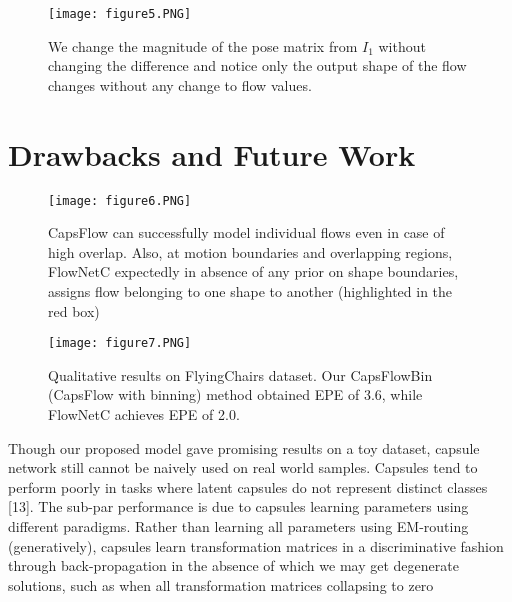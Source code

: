 \documentclass[11pt]{article}
\begin{document}
\begin{figure}
\centering
\texttt{[image: figure5.PNG]}
\caption{We change the magnitude of the pose matrix from
\(I_{1}\) without changing the difference and notice only the output shape of the flow changes without any change to flow
values.
}
\end{figure}


\section{Drawbacks and Future Work}

\begin{figure*}
\centering
\texttt{[image: figure6.PNG]}
\caption{CapsFlow can successfully model individual flows even in case of high overlap. Also, at motion boundaries and
overlapping regions, FlowNetC expectedly in absence of any prior on shape boundaries, assigns flow belonging to one shape
to another (highlighted in the red box)}
\end{figure*}

\begin{figure*}
\centering
\texttt{[image: figure7.PNG]}
\caption{Qualitative results on FlyingChairs dataset. Our CapsFlowBin (CapsFlow with binning) method obtained EPE of
3.6, while FlowNetC achieves EPE of 2.0.}
\end{figure*}

Though our proposed model gave promising results on
a toy dataset, capsule network still cannot be naively used
on real world samples. Capsules tend to perform poorly in
tasks where latent capsules do not represent distinct classes
[13]. The sub-par performance is due to capsules learning
parameters using different paradigms. Rather than learning all parameters using EM-routing (generatively), capsules learn transformation matrices in a discriminative fashion through back-propagation in the absence of which we
may get degenerate solutions, such as when all transformation matrices collapsing to zero 
\end{document}
